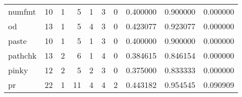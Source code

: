 \begin{tabular}{lrrrrrrrrr}
numfmt    &                                       10 &                                                  1 &                                                  5 &                                                  1 &                                                  3 &                                                  0 &                                           0.400000 &                               0.900000 &                             0.000000 \\
od        &                                       13 &                                                  1 &                                                  5 &                                                  4 &                                                  3 &                                                  0 &                                           0.423077 &                               0.923077 &                             0.000000 \\
paste     &                                       10 &                                                  1 &                                                  5 &                                                  1 &                                                  3 &                                                  0 &                                           0.400000 &                               0.900000 &                             0.000000 \\
pathchk   &                                       13 &                                                  2 &                                                  6 &                                                  1 &                                                  4 &                                                  0 &                                           0.384615 &                               0.846154 &                             0.000000 \\
pinky     &                                       12 &                                                  2 &                                                  5 &                                                  2 &                                                  3 &                                                  0 &                                           0.375000 &                               0.833333 &                             0.000000 \\
pr        &                                       22 &                                                  1 &                                                 11 &                                                  4 &                                                  4 &                                                  2 &                                           0.443182 &                               0.954545 &                             0.090909 \\

\end{tabular}

